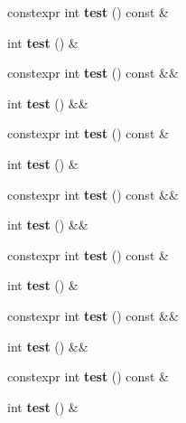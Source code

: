 \begin{DoxyCompactItemize}
constexpr int {\bfseries test} () const \&
\item 
\mbox{\label{class_x_a414e719e3f5bbfb9f0aa52ea9829f9f4}} 
int {\bfseries test} () \&
\item 
\mbox{\label{class_x_a3a9818e8fe809b8c2476343e1bbcee2a}} 
constexpr int {\bfseries test} () const \&\&
\item 
\mbox{\label{class_x_a5a618aa35a4a926f063f07bf0ae21059}} 
int {\bfseries test} () \&\&
\item 
\mbox{\label{class_x_a031f2935fbc7e389c98a56f6d66d88db}} 
constexpr int {\bfseries test} () const \&
\item 
\mbox{\label{class_x_a414e719e3f5bbfb9f0aa52ea9829f9f4}} 
int {\bfseries test} () \&
\item 
\mbox{\label{class_x_a3a9818e8fe809b8c2476343e1bbcee2a}} 
constexpr int {\bfseries test} () const \&\&
\item 
\mbox{\label{class_x_a5a618aa35a4a926f063f07bf0ae21059}} 
int {\bfseries test} () \&\&
\item 
\mbox{\label{class_x_a031f2935fbc7e389c98a56f6d66d88db}} 
constexpr int {\bfseries test} () const \&
\item 
\mbox{\label{class_x_a414e719e3f5bbfb9f0aa52ea9829f9f4}} 
int {\bfseries test} () \&
\item 
\mbox{\label{class_x_a3a9818e8fe809b8c2476343e1bbcee2a}} 
constexpr int {\bfseries test} () const \&\&
\item 
\mbox{\label{class_x_a5a618aa35a4a926f063f07bf0ae21059}} 
int {\bfseries test} () \&\&
\item 
\mbox{\label{class_x_a031f2935fbc7e389c98a56f6d66d88db}} 
constexpr int {\bfseries test} () const \&
\item 
\mbox{\label{class_x_a414e719e3f5bbfb9f0aa52ea9829f9f4}} 
int {\bfseries test} () \&
\item 

\end{DoxyCompactItemize}
